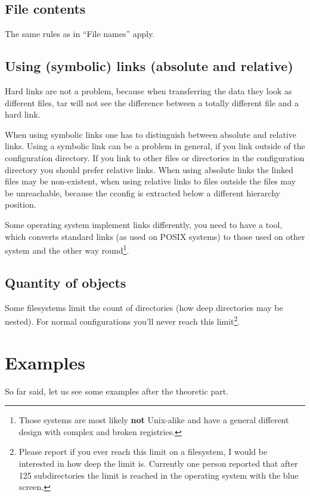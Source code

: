\documentclass[11pt,a4paper]{article}
\begin{document}
\subsection{File contents}
The same rules as in "`File names"' apply.
\subsection{Using (symbolic) links (absolute and relative)}
\label{port-links}
Hard links are not a problem, because when transferring the data they look
as different files, tar will not see the difference between a totally
different file and a hard link.

When using symbolic links one has to distinguish between absolute
and relative links. Using a symbolic link can be a problem in general, if
you link outside of the configuration directory. If you link to other
files or directories in the configuration directory you should prefer
relative links. When using absolute links the linked files
may be non-existent, when using relative links to files outside
the files may be unreachable, because the cconfig is extracted
below a different hierarchy position.

Some operating system implement links differently, you need
to have a tool, which converts standard links (as used on POSIX
systems) to those used on other system and the other way
round\footnote{Those systems are most likely \textbf{not} Unix-alike and
have a general different design with complex and broken registries.}.
\subsection{Quantity of objects}
\label{port-dir}
Some filesystems limit the count of directories (how deep directories
may be nested). For normal configurations you'll never reach this
limit\footnote{Please report if you ever reach this limit on a filesystem,
I would be interested in how deep the limit is. Currently one person
reported that after 125 subdirectories the limit is reached in the
operating system with the blue screen.}.
\section{Examples}
So far said, let us see some examples after the theoretic part.
\end{document}
